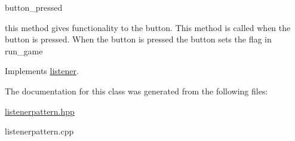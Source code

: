 button\+\_\+pressed 

this method gives functionality to the button. This method is called when the button is pressed. When the button is pressed the button sets the flag in run\+\_\+game 

Implements \hyperlink{classlistener_a22d7490fe1dce838b165d912f8015f0a}{listener}.



The documentation for this class was generated from the following files\+:\begin{DoxyCompactItemize}
\item 
\hyperlink{listenerpattern_8hpp}{listenerpattern.\+hpp}\item 
listenerpattern.\+cpp\end{DoxyCompactItemize}
